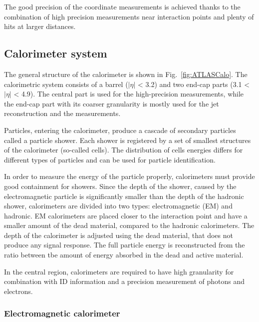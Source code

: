 The good precision of the coordinate measurements is achieved thanks to the combination of high precision measurements near interaction points and plenty of hits at larger distances.

\subsection{Calorimeter system}\label{sec:forwardCalo}
\begin{figure}[!tb]
\end{figure}

The general structure of the \atlas calorimeter is shown in Fig.~\ref{fig:ATLASCalo}. The calorimetric system consists of a barrel ($|\eta|$ < 3.2) and two end-cap parts (3.1 < $|\eta|$  < 4.9). The central part is used for the high-precision measurements, while the end-cap part with its coarser granularity is mostly used for the jet reconstruction and  the \etmiss measurements. 

Particles, entering the calorimeter, produce a cascade of secondary particles called a particle shower. Each shower is registered by a set of smallest structures of the calorimeter (so-called cells). The distribution of cells energies differs for different types of particles and can be used for particle identification. 

In order to measure the energy of the particle properly, calorimeters must provide good containment for showers.  Since the depth of the shower, caused by the electromagnetic particle is significantly smaller than the depth of the hadronic shower, calorimeters are divided into two types: electromagnetic (EM) and hadronic. EM calorimeters are placed closer to the interaction point and have a smaller amount of the dead material, compared to the hadronic calorimeters. The depth of the calorimeter is adjusted using  the dead material, that does not produce any signal response. The full particle energy is reconstructed from the ratio between tbe amount of energy absorbed in the dead and active material.

In the central region, calorimeters are required to have high granularity for combination with ID information and a precision measurement of photons and electrons. 

\subsubsection{Electromagnetic calorimeter}
\begin{figure}[!tb]
\end{figure}

